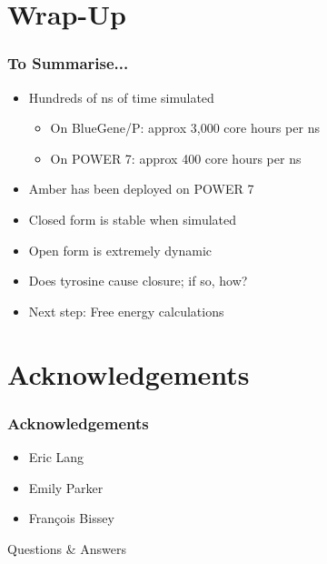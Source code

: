 \documentclass{beamer}
\begin{document}
\section{Wrap-Up}
\begin{frame}
	\frametitle{To Summarise...}
	\begin{itemize}
		\item Hundreds of ns of time simulated
		\begin{itemize}
			\item On BlueGene/P: approx 3,000 core hours per ns
			\item On POWER 7: approx 400 core hours per ns
		\end{itemize}
		\item Amber has been deployed on POWER 7
		\item Closed form is stable when simulated
		\item Open form is extremely dynamic
		\item Does tyrosine cause closure; if so, how?
		\item Next step: Free energy calculations
	\end{itemize}
\end{frame}

\section{Acknowledgements}
\begin{frame}
  \frametitle{Acknowledgements}
   \begin{itemize}
	\item Eric Lang
	\item Emily Parker
	\item Fran\c{c}ois Bissey
	\end{itemize}
\end{frame}


{
  \begin{frame}[plain]
    \begin{center}
    {\Huge Questions \& Answers}
    \end{center}
  \end{frame}
}
\end{document}
